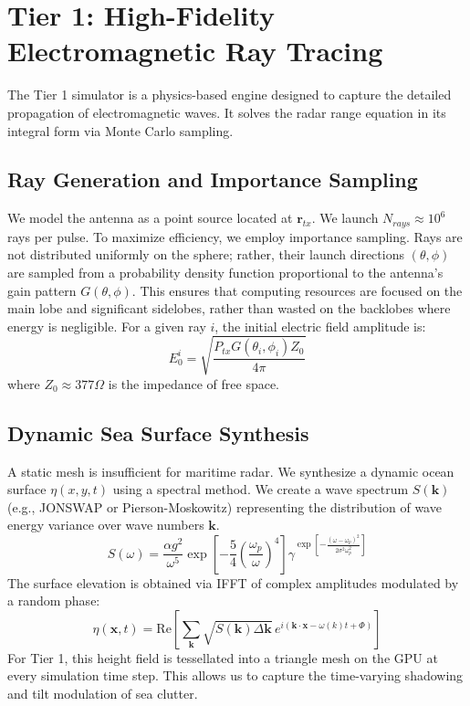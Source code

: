 \documentclass[conf]{new-aiaa}
\begin{document}
\section{Tier 1: High-Fidelity Electromagnetic Ray Tracing}
The Tier 1 simulator is a physics-based engine designed to capture the detailed propagation of electromagnetic waves. It solves the radar range equation in its integral form via Monte Carlo sampling.

\subsection{Ray Generation and Importance Sampling}
We model the antenna as a point source located at $\mathbf{r}_{tx}$. We launch $N_{rays} \approx 10^6$ rays per pulse. To maximize efficiency, we employ importance sampling. Rays are not distributed uniformly on the sphere; rather, their launch directions $(\theta, \phi)$ are sampled from a probability density function proportional to the antenna's gain pattern $G(\theta, \phi)$. This ensures that computing resources are focused on the main lobe and significant sidelobes, rather than wasted on the backlobes where energy is negligible.
For a given ray $i$, the initial electric field amplitude is:
\begin{equation}
    E_0^i = \sqrt{\frac{P_{tx} G(\theta_i, \phi_i) Z_0}{4\pi}}
\end{equation}
where $Z_0 \approx 377 \Omega$ is the impedance of free space.

\subsection{Dynamic Sea Surface Synthesis}
A static mesh is insufficient for maritime radar. We synthesize a dynamic ocean surface $\eta(x, y, t)$ using a spectral method. We create a wave spectrum $S(\mathbf{k})$ (e.g., JONSWAP or Pierson-Moskowitz) representing the distribution of wave energy variance over wave numbers $\mathbf{k}$.
\begin{equation}
    S(\omega) = \frac{\alpha g^2}{\omega^5} \exp\left[-\frac{5}{4}\left(\frac{\omega_p}{\omega}\right)^4\right] \gamma^{\exp\left[-\frac{(\omega - \omega_p)^2}{2\sigma^2 \omega_p^2}\right]}
\end{equation}
The surface elevation is obtained via IFFT of complex amplitudes modulated by a random phase:
\begin{equation}
    \eta(\mathbf{x}, t) = \text{Re} \left[ \sum_{\mathbf{k}} \sqrt{S(\mathbf{k}) \Delta \mathbf{k}} \, e^{i(\mathbf{k} \cdot \mathbf{x} - \omega(k) t + \Phi)} \right]
\end{equation}
For Tier 1, this height field is tessellated into a triangle mesh on the GPU at every simulation time step. This allows us to capture the time-varying shadowing and tilt modulation of sea clutter.
\end{document}
